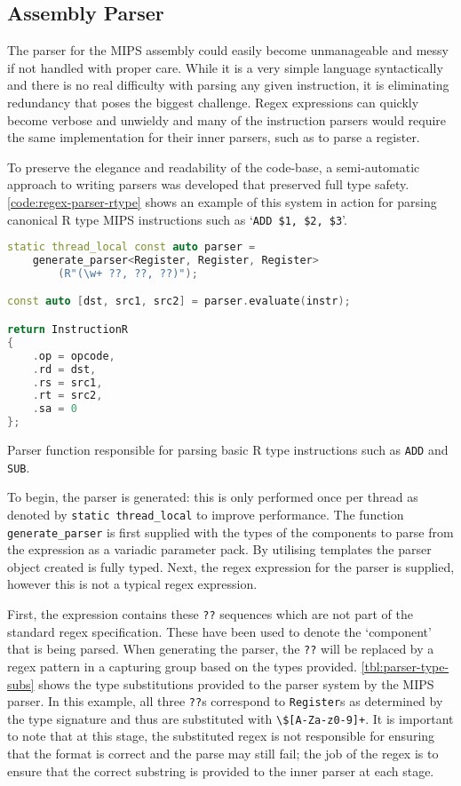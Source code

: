 \subsection{Assembly Parser}

The parser for the MIPS assembly could easily become unmanageable and messy if not handled with proper care. While it is a very simple language syntactically and there is no real difficulty with parsing any given instruction, it is eliminating redundancy that poses the biggest challenge. Regex expressions can quickly become verbose and unwieldy and many of the instruction parsers would require the same implementation for their inner parsers, such as to parse a register.

To preserve the elegance and readability of the code-base, a semi-automatic approach to writing parsers was developed that preserved full type safety. \autoref{code:regex-parser-rtype} shows an example of this system in action for parsing canonical R type MIPS instructions such as `\texttt{ADD \$1, \$2, \$3}'.

\begin{lstfloat}[H]
    \begin{lstlisting}[language=c++]
static thread_local const auto parser =
    generate_parser<Register, Register, Register>
        (R"(\w+ ??, ??, ??)");

const auto [dst, src1, src2] = parser.evaluate(instr);

return InstructionR
{
    .op = opcode,
    .rd = dst,
    .rs = src1,
    .rt = src2,
    .sa = 0
};
    \end{lstlisting}
    \caption{Parser function responsible for parsing basic R type instructions such as \texttt{ADD} and \texttt{SUB}.}
    \label{code:regex-parser-rtype}
\end{lstfloat}

To begin, the parser is generated: this is only performed once per thread as denoted by \texttt{static thread\_local} to improve performance. The function \texttt{generate\_parser} is first supplied with the types of the components to parse from the expression as a variadic parameter pack. By utilising templates the parser object created is fully typed. Next, the regex expression for the parser is supplied, however this is not a typical regex expression.

First, the expression contains these \texttt{??} sequences which are not part of the standard regex specification. These have been used to denote the `component' that is being parsed. When generating the parser, the \texttt{??} will be replaced by a regex pattern in a capturing group based on the types provided. \autoref{tbl:parser-type-subs} shows the type substitutions provided to the parser system by the MIPS parser. In this example, all three \texttt{??}s correspond to \texttt{Register}s as determined by the type signature and thus are substituted with \texttt{\textbackslash \$[A-Za-z0-9]+}. It is important to note that at this stage, the substituted regex is not responsible for ensuring that the format is correct and the parse may still fail; the job of the regex is to ensure that the correct substring is provided to the inner parser at each stage.

